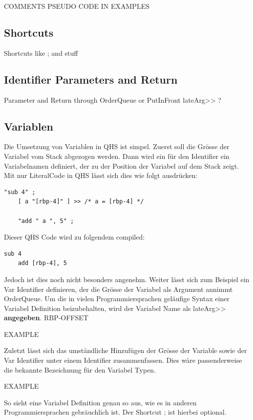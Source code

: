 COMMENTS PSEUDO CODE IN EXAMPLES

\subsection{Shortcuts}
Shortcuts like ; and stuff

\subsection{Identifier Parameters and Return}
Parameter and Return through OrderQueue or PutInFront
lateArg>> ?

\subsection{Variablen} \label{sec:qhs-vars}
Die Umsetzung von Variablen in QHS ist simpel. Zuerst soll die Grösse der Variabel vom Stack abgezogen werden. Dann wird ein für den Identifier ein Variabelnamen definiert, der zu der Position der Variabel auf dem Stack zeigt.
Mit nur LiteralCode in QHS lässt sich dies wie folgt ausdrücken:

\begin{lstlisting}[language=QHS, label=eg:qhs-var-literal, caption=THING, frame=single]
    "sub 4" ;
    [ a "[rbp-4]" ] >> /* a = [rbp-4] */

    "add " a ", 5" ;
\end{lstlisting}

Dieser QHS Code wird zu folgendem compiled:

\begin{lstlisting}[label=eg:qhs-var-literal-compiled, caption=THING]
    sub 4
    add [rbp-4], 5
\end{lstlisting}

Jedoch ist dies noch nicht besonders angenehm. Weiter lässt sich zum Beispiel ein Var Identifier definieren, der die Grösse der Variabel als Argument annimmt OrderQueue. Um die in vielen Programmiersprachen geläufige Syntax
einer Variabel Definition beizubehalten, wird der Variabel Name als lateArg>> \textbf{angegeben}.
RBP-OFFSET

EXAMPLE

Zuletzt lässt sich das umständliche Hinzufügen der Grösse der Variable sowie der Var Identifier unter einem Identifier zusammenfassen. Dies wäre passenderweise die bekannte Bezeichnung für den Variabel Typen.

EXAMPLE

So sieht eine Variabel Definition genau so aus, wie es in anderen Programmiersprachen gebräuchlich ist. Der Shortcut ; ist hierbei optional.

